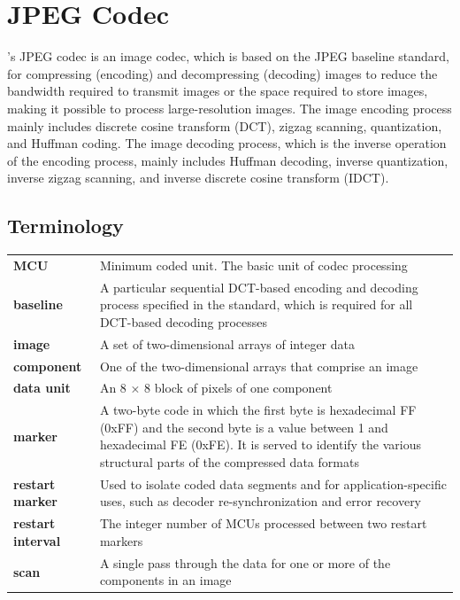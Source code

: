 \documentclass[main\_\_EN.tex]{subfiles}
\begin{document}

\ifglobal
\else
    {\let\clearpage\relax \listoftodos}
    {\let\clearpage\relax \listofdonetodos}
    \tableofcontents
\fi



\hypertarget{jpegcodec}{}
\chapter{JPEG Codec}
\label{mod:jpegcodec}
\chipname{}'s JPEG codec is an image codec, which is based on the JPEG baseline standard, for compressing (encoding) and decompressing (decoding) images to reduce the bandwidth required to transmit images or the space required to store images, making it possible to process large-resolution images. The image encoding process mainly includes discrete cosine transform (DCT), zigzag scanning, quantization, and Huffman coding. The image decoding process, which is the inverse operation of the encoding process, mainly includes Huffman decoding, inverse quantization, inverse zigzag scanning, and inverse discrete cosine transform (IDCT).

\section{Terminology}
\begin{longtable}[c]{ R{4cm} p{12cm} }
\textbf{MCU} & Minimum coded unit. The basic unit of codec processing \\
\textbf{baseline} & A particular sequential DCT-based encoding and decoding process specified in the standard, which is required for all DCT-based decoding processes \\
\textbf{image} & A set of two-dimensional arrays of integer data \\
\textbf{component} & One of the two-dimensional arrays that comprise an image \\
\textbf{data unit} & An 8 × 8 block of pixels of one component \\
\textbf{marker} & A two-byte code in which the first byte is hexadecimal FF (0xFF) and the second byte is a value between 1 and hexadecimal FE (0xFE). It is served to identify the various structural parts of the compressed data formats \\
\textbf{restart marker} & Used to isolate coded data segments and for application-specific uses, such as decoder re-synchronization and error recovery \\
\textbf{restart interval} & The integer number of MCUs processed between two restart markers \\
\textbf{scan} & A single pass through the data for one or more of the components in an image \\
\end{longtable}
\end{document}
